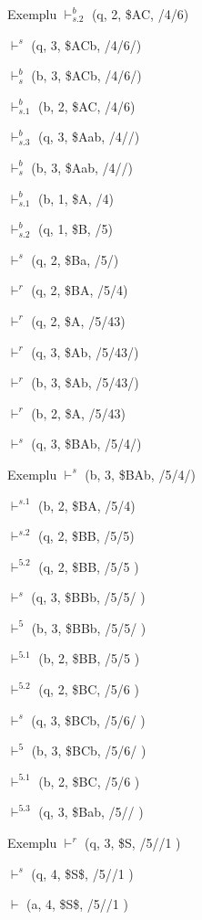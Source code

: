 \documentclass[pdf]{beamer}
\begin{document}
\begin{frame}{Exemplu}
$\vdash^{b}_{s.2}$ (q, 2, \$AC, /4/6)

$\vdash^{s}$ (q, 3, \$ACb, /4/6/)

$\vdash^{b}_{s}$ (b, 3, \$ACb, /4/6/)

$\vdash^{b}_{s.1}$ (b, 2, \$AC, /4/6)

$\vdash^{b}_{s.3}$ (q, 3, \$Aab, /4//)

$\vdash^{b}_{s}$ (b, 3, \$Aab, /4//)

$\vdash^{b}_{s.1}$ (b, 1, \$A, /4)

$\vdash^{b}_{s.2}$ (q, 1, \$B, /5)

$\vdash^{s}$ (q, 2, \$Ba, /5/)

$\vdash^{r}$ (q, 2, \$BA, /5/4)

$\vdash^{r}$ (q, 2, \$A, /5/43)

$\vdash^{r}$ (q, 3, \$Ab, /5/43/)

$\vdash^{r}$ (b, 3, \$Ab, /5/43/)

$\vdash^{r}$ (b, 2, \$A, /5/43)

$\vdash^{s}$ (q, 3, \$BAb, /5/4/)
 
\end{frame}



\begin{frame}{Exemplu}
$\vdash^{s}$ (b, 3, \$BAb, /5/4/)

$\vdash^{s.1}$ (b, 2, \$BA, /5/4)

$\vdash^{s.2}$ (q, 2, \$BB, /5/5)

$\vdash^{5.2}$  (q, 2, \$BB, /5/5 )

$\vdash^{s}$  (q, 3, \$BBb, /5/5/ )

$\vdash^{5}$  (b, 3, \$BBb, /5/5/ )

$\vdash^{5.1}$  (b, 2, \$BB, /5/5 )

$\vdash^{5.2}$  (q, 2, \$BC, /5/6 )

$\vdash^{s}$  (q, 3, \$BCb, /5/6/ )

$\vdash^{5}$  (b, 3, \$BCb, /5/6/ )

$\vdash^{5.1}$  (b, 2, \$BC, /5/6 )

$\vdash^{5.3}$  (q, 3, \$Bab, /5// )
\end{frame}



\begin{frame}{Exemplu}
$\vdash^{r}$  (q, 3, \$S, /5//1 )

$\vdash^{s}$  (q, 4, \$S\$, /5//1 )

$\vdash$  (a, 4, \$S\$, /5//1 )
\end{frame}
\end{document}
